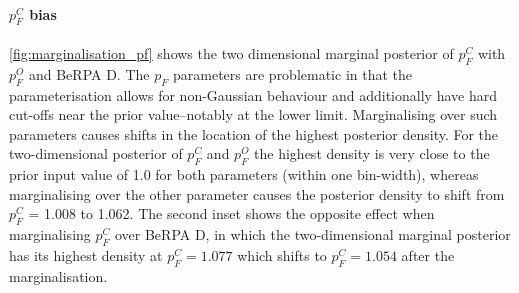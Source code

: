 \paragraph{$p_F^C$ bias}
\autoref{fig:marginalisation_pf} shows the two dimensional marginal posterior of $p_F^C$ with $p_F^O$ and BeRPA D. The $p_F$ parameters are problematic in that the parameterisation allows for non-Gaussian behaviour and additionally have hard cut-offs near the prior value--notably at the lower limit. Marginalising over such parameters causes shifts in the location of the highest posterior density. For the two-dimensional posterior of $p_F^C$ and $p_F^O$ the highest density is very close to the prior input value of 1.0 for both parameters (within one bin-width), whereas marginalising over the other parameter causes the posterior density to shift from $p_F^{C}$ = 1.008 to 1.062. The second inset shows the opposite effect when marginalising $p_F^{C}$ over BeRPA D, in which the two-dimensional marginal posterior has its highest density at $p_F^{C} = 1.077$ which shifts to $p_F^{C} = 1.054$ after the marginalisation.
